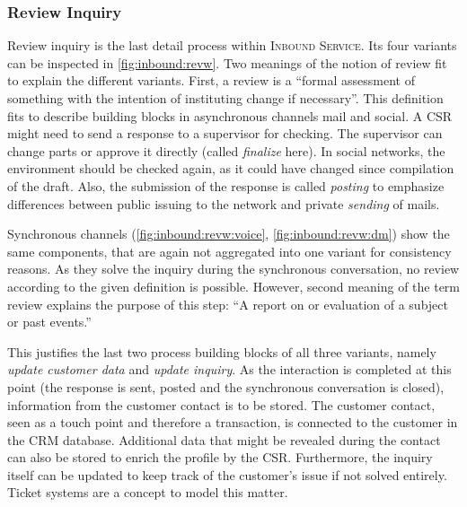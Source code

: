 	 
	 \subsubsection{Review Inquiry}
	 \label{inb:review}
	 Review inquiry is the last detail process within \textsc{Inbound Service}. Its four variants can be inspected in \Fig \ref{fig:inbound:revw}. Two meanings of the notion of review \citep{oxfordreview} fit to explain the different variants. First, a review is a \enquote{formal assessment of something with the intention of instituting change if necessary}. This definition fits to describe building blocks in asynchronous channels mail and social. A \acrshort{CSR} might need to send a response to a supervisor for checking. The supervisor can change parts or approve it directly (called \textit{finalize} here). In social networks, the environment should be checked again, as it could have changed since compilation of the draft. Also, the submission of the response is called \textit{posting} to emphasize differences between public issuing to the network and private \textit{sending} of mails.
	 
	 Synchronous channels (\cf \Fig \ref{fig:inbound:revw:voice}, \ref{fig:inbound:revw:dm}) show the same components, that are again not aggregated into one variant for consistency reasons. As they solve the inquiry during the synchronous conversation, no review according to the given definition is possible. However, second meaning of the term review explains the purpose of this step: \enquote{A report on or evaluation of a subject or past events.} 
	 
	 This justifies the last two process building blocks of all three variants, namely \textit{update customer data} and \textit{update inquiry}. As the interaction is completed at this point (\viz the response is sent, posted and the synchronous conversation is closed), information from the customer contact is to be stored. The customer contact, seen as a touch point and therefore a transaction, is connected to the customer in the \acrshort{CRM} database. Additional data that might be revealed during the contact can also be stored to enrich the profile by the \acrshort{CSR}. Furthermore, the inquiry itself can be updated to keep track of the customer's issue if not solved entirely. Ticket systems are a concept to model this matter. %
	 
